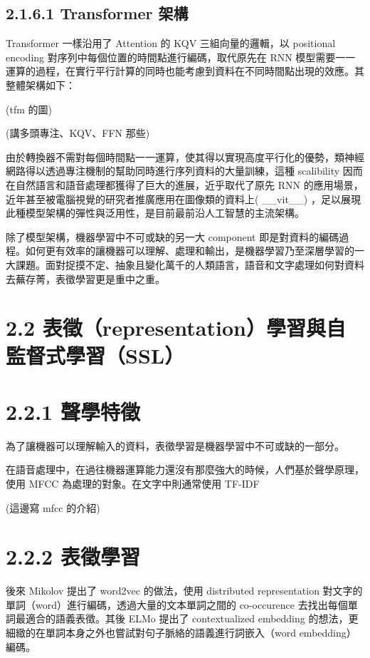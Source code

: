\subsection{2.1.6.1 Transformer 架構}

Transformer 一樣沿用了 Attention 的 KQV 三組向量的邏輯，以 positional encoding 對序列中每個位置的時間點進行編碼，取代原先在 RNN 模型需要一一運算的過程，在實行平行計算的同時也能考慮到資料在不同時間點出現的效應。其整體架構如下：

(tfm 的圖)

(講多頭專注、KQV、FFN 那些)

由於轉換器不需對每個時間點一一運算，使其得以實現高度平行化的優勢，類神經網路得以透過專注機制的幫助同時進行序列資料的大量訓練，這種 scalibility 因而在自然語言和語音處理都獲得了巨大的進展，近乎取代了原先 RNN 的應用場景，近年甚至被電腦視覺的研究者推廣應用在圖像類的資料上( \_\_vit\_\_) ，足以展現此種模型架構的彈性與泛用性，是目前最前沿人工智慧的主流架構。

除了模型架構，機器學習中不可或缺的另一大 component 即是對資料的編碼過程。如何更有效率的讓機器可以理解、處理和輸出，是機器學習乃至深層學習的一大課題。面對捉摸不定、抽象且變化萬千的人類語言，語音和文字處理如何對資料去蕪存菁，表徵學習更是重中之重。

\section{2.2 表徵（representation）學習與自監督式學習（SSL）}

\section{2.2.1 聲學特徵}

為了讓機器可以理解輸入的資料，表徵學習是機器學習中不可或缺的一部分。

在語音處理中，在過往機器運算能力還沒有那麼強大的時候，人們基於聲學原理，使用 MFCC 為處理的對象。在文字中則通常使用 TF-IDF

(這邊寫 mfcc 的介紹)

\section{2.2.2 表徵學習}

後來 Mikolov 提出了 word2vec 的做法，使用 distributed representation 對文字的單詞（word）進行編碼，透過大量的文本單詞之間的 co-occurence 去找出每個單詞最適合的語義表徵。其後 ELMo 提出了 contextualized embedding 的想法，更細緻的在單詞本身之外也嘗試對句子脈絡的語義進行詞嵌入（word embedding）編碼。

